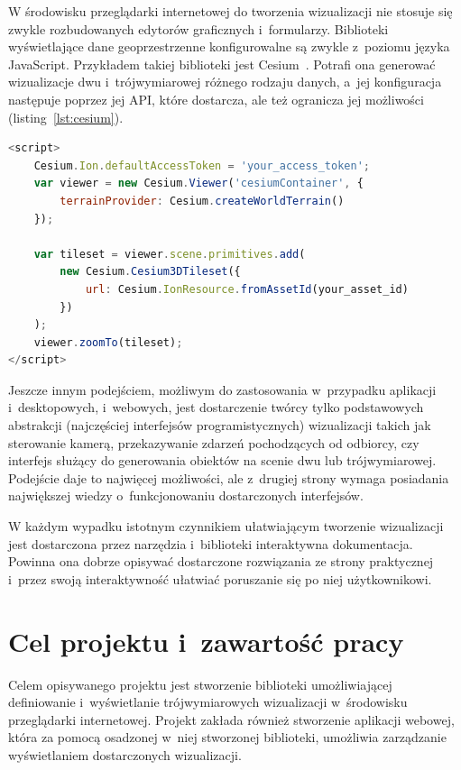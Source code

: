 W środowisku przeglądarki internetowej do tworzenia wizualizacji nie stosuje się zwykle rozbudowanych edytorów graficznych i~formularzy. Biblioteki wyświetlające dane geoprzestrzenne konfigurowalne są zwykle z~poziomu języka JavaScript. Przykładem takiej biblioteki jest \mbox{Cesium~\cite{CesiumJS}}. Potrafi ona generować wizualizacje dwu i~trójwymiarowej różnego rodzaju danych, a~jej konfiguracja następuje poprzez jej API, które dostarcza, ale też ogranicza jej możliwości (listing~\ref{lst:cesium}).

\begin{lstlisting}[label={lst:cesium}, language=javascript, caption={Konfiguracja podstawowej wizualizacji w~bibliotece Cesium. Żródło~\cite{CesiumJSExample}.}]
<script>
    Cesium.Ion.defaultAccessToken = 'your_access_token';
    var viewer = new Cesium.Viewer('cesiumContainer', {
        terrainProvider: Cesium.createWorldTerrain()
    });

    var tileset = viewer.scene.primitives.add(
        new Cesium.Cesium3DTileset({
            url: Cesium.IonResource.fromAssetId(your_asset_id)
        })
    );
    viewer.zoomTo(tileset);
</script>
\end{lstlisting}

Jeszcze innym podejściem, możliwym do zastosowania w~przypadku aplikacji i~desktopowych, i~webowych, jest dostarczenie twórcy tylko podstawowych abstrakcji (najczęściej interfejsów programistycznych) wizualizacji takich jak sterowanie kamerą, przekazywanie zdarzeń pochodzących od odbiorcy, czy interfejs służący do generowania obiektów na scenie dwu lub trójwymiarowej. Podejście daje to najwięcej możliwości, ale z~drugiej strony wymaga posiadania największej wiedzy o~funkcjonowaniu dostarczonych interfejsów.

W każdym wypadku istotnym czynnikiem ułatwiającym tworzenie wizualizacji jest dostarczona przez narzędzia i~biblioteki interaktywna dokumentacja. Powinna ona dobrze opisywać dostarczone rozwiązania ze strony praktycznej i~przez swoją interaktywność ułatwiać poruszanie się po niej użytkownikowi. 

\section{Cel projektu i~zawartość pracy}

Celem opisywanego projektu jest stworzenie biblioteki umożliwiającej definiowanie i~wyświetlanie trójwymiarowych wizualizacji w~środowisku przeglądarki internetowej. Projekt zakłada również stworzenie aplikacji webowej, która za pomocą osadzonej w~niej stworzonej biblioteki, umożliwia zarządzanie wyświetlaniem dostarczonych wizualizacji.

